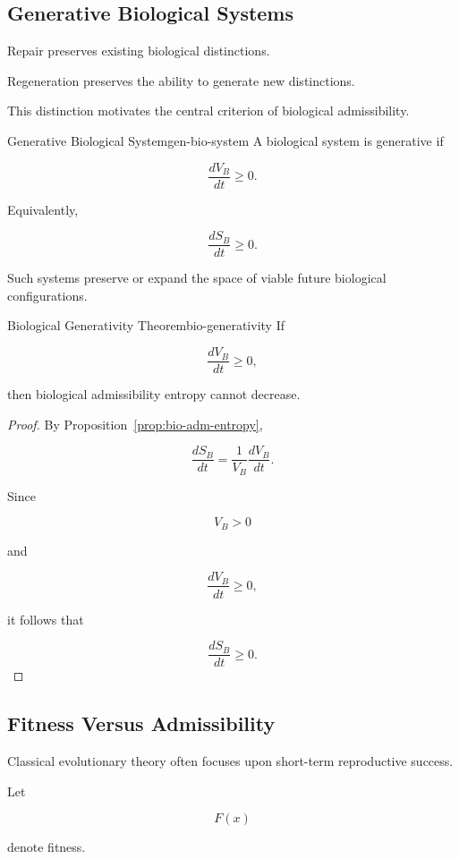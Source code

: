\documentclass[12pt,twoside,openright]{book}
\begin{document}
\subsection{Generative Biological Systems}

Repair preserves existing biological distinctions.

Regeneration preserves the ability to generate new
distinctions.

This distinction motivates the central criterion of
biological admissibility.

\begin{definition}{Generative Biological System}{gen-bio-system}
A biological system is generative if

\[
\frac{dV_B}{dt}
\ge 0.
\]
\end{definition}

Equivalently,

\[
\frac{dS_B}{dt}
\ge 0.
\]

Such systems preserve or expand the space of viable
future biological configurations.

\begin{theorem}{Biological Generativity Theorem}{bio-generativity}
If

\[
\frac{dV_B}{dt}
\ge 0,
\]

then biological admissibility entropy cannot decrease.
\end{theorem}

\begin{proof}
By Proposition~\ref{prop:bio-adm-entropy},

\[
\frac{dS_B}{dt}
=
\frac{1}{V_B}
\frac{dV_B}{dt}.
\]

Since

\[
V_B>0
\]

and

\[
\frac{dV_B}{dt}\ge0,
\]

it follows that

\[
\frac{dS_B}{dt}\ge0.
\]
\end{proof}

\subsection{Fitness Versus Admissibility}

Classical evolutionary theory often focuses upon
short-term reproductive success.

Let

\[
F(x)
\]

denote fitness.
\end{document}
